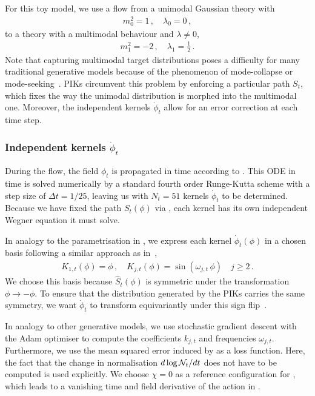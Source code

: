 \documentclass[reprint,amsmath,amssymb,aps,pra,superscriptaddress,nofootinbib,twocolumn,floatfix,nolongbibliography]{revtex4-2}
\begin{document}
For this toy model, we use a flow from a unimodal Gaussian theory with 
%
\begin{align} 
m_0^2 = 1  \,, \quad \lambda_0 =0\,,
\end{align} 	
%
to a theory with a multimodal behaviour and $\lambda\neq 0$, 
%
\begin{align} 
	m_1^2 = -2  \,, \quad \lambda_1 =\frac12\,. 
\end{align} 	
%
Note that capturing multimodal target distributions poses a difficulty for many traditional generative models because of the phenomenon of mode-collapse or mode-seeking~\cite{Hackett:2021idh,Nicoli:2023qsl,Chen:2022ytr}. PIKs circumvent this problem by enforcing a particular path $S_t$, which fixes the way the unimodal distribution is morphed into the multimodal one. Moreover, the independent kernels $\dot\phi_t$ allow for an error correction at each time step.


\subsubsection{Independent kernels $\dot\phi_t$}
\label{sec:IndependentKernels_0D}

During the flow, the field $\phi_t$ is propagated in time according to . This ODE in time is solved numerically by a standard fourth order Runge-Kutta scheme with a step size of $\Delta t = 1 / 25$, leaving us with $N_t=51$ kernels $\dot{\phi}_t$ to be determined. Because we have fixed the path $S_t(\phi)$ via , each kernel has its own independent Wegner equation  it must solve.

In analogy to the parametrisation in , we express each kernel $\dot{\phi}_t(\phi)$ in a chosen basis following a similar approach as in~\cite{Gerdes:2022eve},
%
\begin{align}\label{eq:SpecBasis}
    K_{1,t}(\phi) = \phi\,, \quad K_{j,t}(\phi) = \sin\left( \omega_{j,t} \,\phi \right)\quad j \geq 2\,.
\end{align}
%
We choose this basis because $\hat{S}_t(\phi)$ is symmetric under the transformation $\phi \to -\phi$. To ensure that the distribution generated by the PIKs carries the same symmetry, we want $\dot{\phi}_t$ to transform equivariantly under this sign flip~\cite{Koehler:2020efe}. 

In analogy to other generative models, we use stochastic gradient descent with the Adam optimiser to compute the coefficients $k_{j,t}$ and frequencies $\omega_{j,t}$. Furthermore, we use the mean squared error induced by  as a loss function. Here, the fact that the change in normalisation $d \log {\cal N}_t/dt$ does not have to be computed is used explicitly. We choose $\chi=0$ as a reference configuration for , which leads to a vanishing time and field derivative of the action in . 
\end{document}
